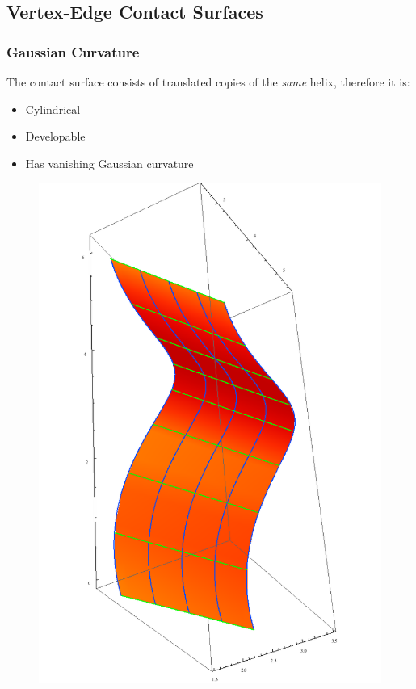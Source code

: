 \documentclass[ucs,9pt,pagenumbersfull]{beamer}
\begin{document}
\subsection{Vertex-Edge Contact Surfaces}
\begin{frame}
  \frametitle{Gaussian Curvature}
  \begin{minipage}{0.6\linewidth}
    The contact surface consists of translated copies of the
    \emph{same} helix, therefore it is:
    \begin{itemize}
    \item Cylindrical
    \item Developable
    \item Has vanishing Gaussian curvature
    \end{itemize}
  \end{minipage}
  \begin{minipage}{0.35\linewidth}
    \begin{figure}
      \centering
      \includegraphics[height=0.9\textheight]{Figures/ve-full-contact}
    \end{figure}
  \end{minipage}

\end{frame}
\end{document}
